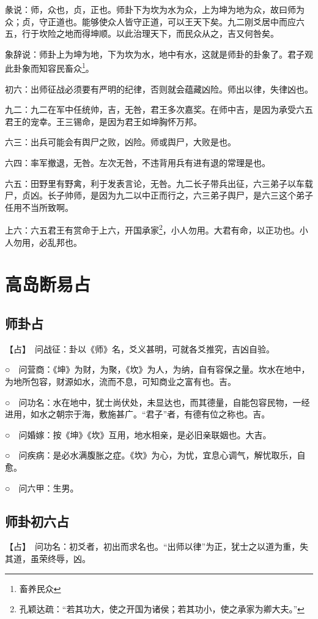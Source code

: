 \documentclass[12pt,oneside]{book}
\begin{document}
彖说：师，众也，贞，正也。师卦下为坎为水为众，上为坤为地为众，故曰师为众；贞，守正道也。能够使众人皆守正道，可以王天下矣。九二刚爻居中而应六五，行于坎险之地而得坤顺。以此治理天下，而民众从之，吉又何咎矣。

象辞说：师卦上为坤为地，下为坎为水，地中有水，这就是师卦的卦象了。君子观此卦象而知容民畜众\footnote{畜养民众}。

初六：出师征战必须要有严明的纪律，否则就会蕴藏凶险。师出以律，失律凶也。

九二：九二在军中任统帅，吉，无咎，君王多次嘉奖。在师中吉，是因为承受六五君王的宠幸。王三锡命，是因为君王如坤胸怀万邦。

六三：出兵可能会有舆尸之败，凶险。师或舆尸，大败是也。

六四：率军撤退，无咎。左次无咎，不违背用兵有进有退的常理是也。

六五：田野里有野禽，利于发表言论，无咎。九二长子带兵出征，六三弟子以车载尸，贞凶。长子帅师，是因为九二以中正而行之，六三弟子舆尸，是六三这个弟子任用不当所致啊。

上六：六五君王有赏命于上六，开国承家\footnote{孔颖达疏：“若其功大，使之开国为诸侯；若其功小，使之承家为卿大夫。”}，小人勿用。大君有命，以正功也。小人勿用，必乱邦也。

\section{高岛断易占}

\subsection{师卦占}
【占】　问战征：卦以《师》名，爻义甚明，可就各爻推究，吉凶自验。

○　问营商：《坤》为财，为聚，《坎》为人，为纳，自有容保之量。坎水在地中，为地所包容，财源如水，流而不息，可知商业之富有也。吉。

○　问功名：水在地中，犹士尚伏处，未显达也，而其德量，自能包容民物，一经进用，如水之朝宗于海，敷施甚广。“君子”者，有德有位之称也。吉。

○　问婚嫁：按《坤》《坎》互用，地水相亲，是必旧亲联姻也。大吉。

○　问疾病：是必水满腹胀之症。《坎》为心，为忧，宜息心调气，解忧取乐，自愈。

○　问六甲：生男。

\subsection{师卦初六占}
【占】　问功名：初爻者，初出而求名也。“出师以律”为正，犹士之以道为重，失其道，虽荣终辱，凶。
\end{document}
